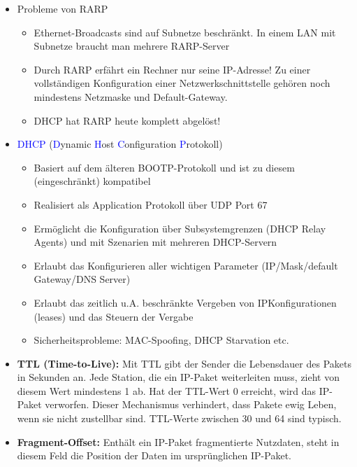 \begin{itemize}
    \item Probleme von RARP
    \begin{itemize}
        \item Ethernet-Broadcasts sind auf Subnetze beschränkt.
        In einem LAN mit Subnetze braucht man mehrere RARP-Server
        \item Durch RARP erfährt ein Rechner nur seine IP-Adresse!
        Zu einer vollständigen Konfiguration einer Netzwerkschnittstelle gehören noch mindestens Netzmaske und Default-Gateway.
        \item DHCP hat RARP heute komplett abgelöst!
    \end{itemize}
    \item \textcolor{blue}{DHCP} (\textcolor{blue}{D}ynamic \textcolor{blue}{H}ost \textcolor{blue}{C}onfiguration \textcolor{blue}{P}rotokoll)
    \begin{itemize}
        \item Basiert auf dem älteren BOOTP-Protokoll und ist zu diesem (eingeschränkt) kompatibel
        \item Realisiert als Application Protokoll über UDP Port 67
        \item Ermöglicht die Konfiguration über Subsystemgrenzen (DHCP Relay Agents) und mit Szenarien mit mehreren DHCP-Servern
        \item Erlaubt das Konfigurieren aller wichtigen Parameter (IP/Mask/default Gateway/DNS Server)
        \item Erlaubt das zeitlich u.A. beschränkte Vergeben von IPKonfigurationen (leases) und das Steuern der Vergabe
        \item Sicherheitsprobleme: MAC-Spoofing, DHCP Starvation etc.
    \end{itemize}
\end{itemize}

\begin{itemize}
    \item \textbf{TTL (Time-to-Live): } Mit TTL gibt der Sender die Lebensdauer des Pakets in Sekunden an.
    Jede Station, die ein IP-Paket weiterleiten muss, zieht von diesem Wert mindestens 1 ab. Hat der TTL-Wert 0 erreicht, wird das IP-Paket verworfen. Dieser Mechanismus verhindert, dass Pakete ewig Leben, wenn sie nicht zustellbar sind. TTL-Werte zwischen 30 und 64 sind typisch.
    \item \textbf{Fragment-Offset:} Enthält ein IP-Paket fragmentierte Nutzdaten, steht in diesem Feld die Position der Daten im ursprünglichen IP-Paket.
\end{itemize}

